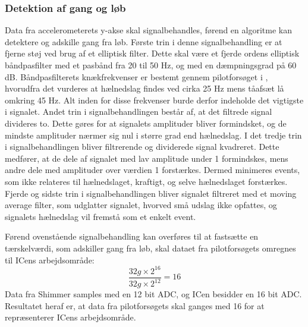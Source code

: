 \subsubsection{Detektion af gang og løb}
Data fra accelerometerets y-akse skal signalbehandles, førend en algoritme kan detektere og adskille gang fra løb. Første trin i denne signalbehandling er at fjerne støj ved brug af et elliptisk filter. Dette skal være et fjerde ordens elliptisk båndpasfilter med et pasbånd fra 20 til 50 Hz, og med en dæmpningsgrad på 60 dB. Båndpasfilterets knækfrekvenser er bestemt gennem pilotforsøget i , hvorudfra det vurderes at hælnedslag findes ved cirka 25 Hz mens tåafsæt lå omkring 45 Hz. Alt inden for disse frekvenser burde derfor indeholde det vigtigste i signalet. %
Andet trin i signalbehandlingen består af, at det filtrede signal divideres to. Dette gøres for at signalets amplituder bliver formindsket, og de mindste amplituder nærmer sig nul i større grad end hælnedslag. I det tredje trin i signalbehandlingen bliver filtrerende og dividerede signal kvadreret. Dette medfører, at de dele af signalet med lav amplitude under 1 formindskes, mens andre dele med amplituder over værdien 1 forstærkes. Dermed minimeres events, som ikke relateres til hælnedslaget, kraftigt, og selve hælnedslaget forstærkes. Fjerde og sidste trin i signalbehandlingen bliver signalet filtreret med et moving average filter, som udglatter signalet, hvorved små udslag ikke opfattes, og signalets hælnedslag vil fremstå som et enkelt event.

Førend ovenstående signalbehandling kan overføres til at fastsætte en tærskelværdi, som adskiller gang fra løb, skal dataet fra pilotforsøgets omregnes til ICens arbejdsområde: 
\begin{equation}
\frac{32 g \times 2^{16}}{32 g \times 2^{12}} = 16
\end{equation}
Data fra Shimmer samples med en 12 bit ADC, og ICen besidder en 16 bit ADC. Resultatet heraf er, at data fra pilotforsøgets skal ganges med 16 for at repræsenterer ICens arbejdsområde.

